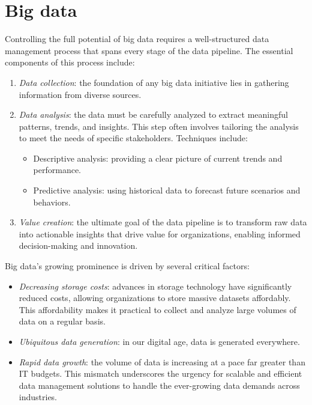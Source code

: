 \section{Big data}

Controlling the full potential of big data requires a well-structured data management process that spans every stage of the data pipeline. 
The essential components of this process include:
\begin{enumerate}
    \item \textit{Data collection}: the foundation of any big data initiative lies in gathering information from diverse sources. 
    \item \textit{Data analysis}: the data must be carefully analyzed to extract meaningful patterns, trends, and insights. 
        This step often involves tailoring the analysis to meet the needs of specific stakeholders. 
        Techniques include:
        \begin{itemize}
            \item Descriptive analysis: providing a clear picture of current trends and performance.
            \item Predictive analysis: using historical data to forecast future scenarios and behaviors.
        \end{itemize}
    \item \textit{Value creation}: the ultimate goal of the data pipeline is to transform raw data into actionable insights that drive value for organizations, enabling informed decision-making and innovation.
\end{enumerate} 
\noindent Big data's growing prominence is driven by several critical factors:
\begin{itemize}
    \item \textit{Decreasing storage costs}: advances in storage technology have significantly reduced costs, allowing organizations to store massive datasets affordably.
        This affordability makes it practical to collect and analyze large volumes of data on a regular basis.
    \item \textit{Ubiquitous data generation}: in our digital age, data is generated everywhere. 
    \item \textit{Rapid data growth}: the volume of data is increasing at a pace far greater than IT budgets. 
        This mismatch underscores the urgency for scalable and efficient data management solutions to handle the ever-growing data demands across industries.
\end{itemize}
